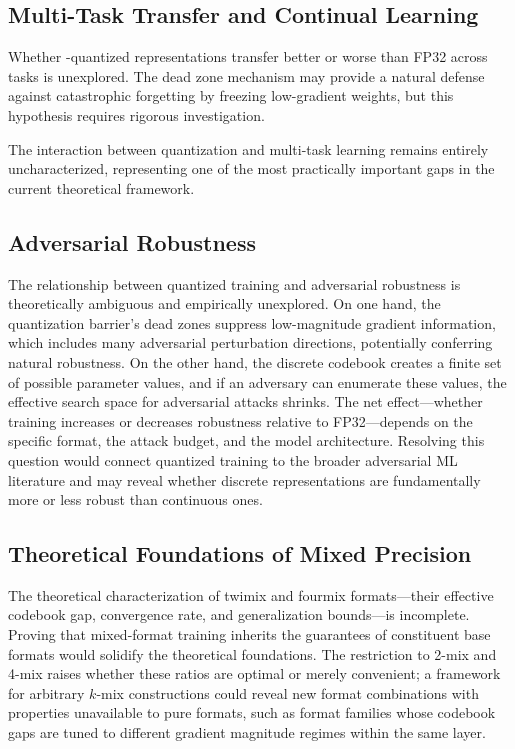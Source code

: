 \subsection{Multi-Task Transfer and Continual Learning}

Whether \OIL{}-quantized representations transfer better or worse than FP32 across tasks is unexplored. The dead zone mechanism may provide a natural defense against catastrophic forgetting by freezing low-gradient weights, but this hypothesis requires rigorous investigation.

The interaction between quantization and multi-task learning remains entirely uncharacterized, representing one of the most practically important gaps in the current theoretical framework.

\subsection{Adversarial Robustness}

The relationship between quantized training and adversarial robustness is theoretically ambiguous and empirically unexplored. On one hand, the quantization barrier's dead zones suppress low-magnitude gradient information, which includes many adversarial perturbation directions, potentially conferring natural robustness. On the other hand, the discrete codebook creates a finite set of possible parameter values, and if an adversary can enumerate these values, the effective search space for adversarial attacks shrinks. The net effect---whether \OIL{} training increases or decreases robustness relative to FP32---depends on the specific format, the attack budget, and the model architecture. Resolving this question would connect quantized training to the broader adversarial ML literature and may reveal whether discrete representations are fundamentally more or less robust than continuous ones.

\subsection{Theoretical Foundations of Mixed Precision}

The theoretical characterization of twimix and fourmix formats---their effective codebook gap, convergence rate, and generalization bounds---is incomplete. Proving that mixed-format training inherits the guarantees of constituent base formats would solidify the theoretical foundations. The restriction to 2-mix and 4-mix raises whether these ratios are optimal or merely convenient; a framework for arbitrary $k$-mix constructions could reveal new format combinations with properties unavailable to pure formats, such as format families whose codebook gaps are tuned to different gradient magnitude regimes within the same layer.

